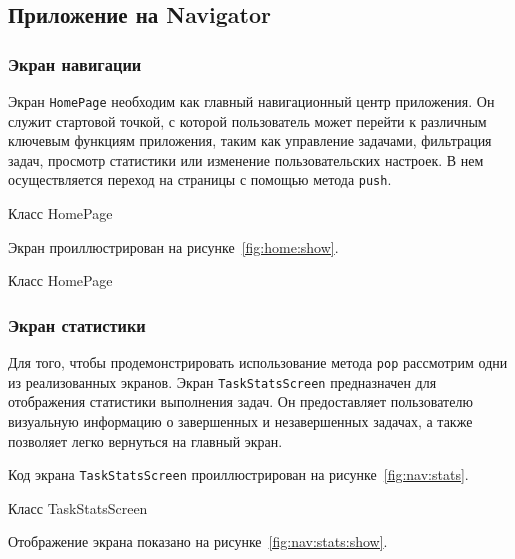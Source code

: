 \subsection{Приложение на Navigator}

\subsubsection{Экран навигации}

Экран \texttt{HomePage}  необходим
как главный навигационный центр приложения.
Он служит стартовой точкой, с которой пользователь может перейти
к различным ключевым функциям приложения, таким как управление задачами,
фильтрация задач, просмотр статистики или изменение пользовательских настроек.
В нем осуществляется переход на страницы с помощью метода \texttt{push}.

\begin{image}
	\caption{Класс HomePage}
	\label{fig:nav:home}
\end{image}

Экран проиллюстрирован на рисунке~\ref{fig:home:show}.

\begin{image}
	\caption{Класс HomePage}
	\label{fig:home:show}
\end{image}

\subsubsection{Экран статистики}

Для того, чтобы продемонстрировать использование метода \texttt{pop}
рассмотрим одни из реализованных экранов.
Экран \texttt{TaskStatsScreen} предназначен
для отображения статистики выполнения задач.
Он предоставляет пользователю визуальную информацию
о завершенных и незавершенных задачах,
а также позволяет легко вернуться на главный экран.

Код экрана \texttt{TaskStatsScreen} проиллюстрирован
на рисунке~\ref{fig:nav:stats}.

\begin{image}
	\caption{Класс TaskStatsScreen}
	\label{fig:nav:stats}
\end{image}

Отображение экрана показано на рисунке~\ref{fig:nav:stats:show}.

